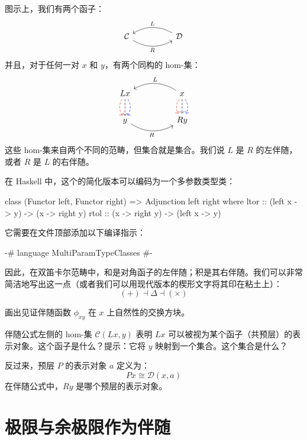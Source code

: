 \documentclass[DaoFP]{subfiles}
\begin{document}
图示上，我们有两个函子：
\[
 \begin{tikzcd}
  \mathcal{C}
  \arrow[rr, bend right, "R"']
  &&
  \mathcal{D}
  \arrow[ll, bend right, "L"']
  \end{tikzcd}
\]
并且，对于任何一对 $x$ 和 $y$，有两个同构的 hom-集：
\[
 \begin{tikzcd}
L x
\arrow[d, bend right, red, dashed]
\arrow[d, dashed]
\arrow[d, bend left, blue, dashed]
  &&
  x
\arrow[d, bend right, red, dashed]
\arrow[d, dashed]
\arrow[d, bend left, blue, dashed]
 \arrow[ll, bend right, "L"']
 \\
y
   \arrow[rr, bend right, "R"']
 &&
 R y
  \end{tikzcd}
\]
这些 hom-集来自两个不同的范畴，但集合就是集合。我们说 $L$ 是 $R$ 的左伴随，或者 $R$ 是 $L$ 的右伴随。

在 Haskell 中，这个的简化版本可以编码为一个多参数类型类：
\begin{haskell}
class (Functor left, Functor right) => Adjunction left right where
  ltor :: (left x -> y) -> (x -> right y)
  rtol :: (x -> right y) -> (left x -> y)
\end{haskell}
它需要在文件顶部添加以下编译指示：
\begin{haskell}
{-# language MultiParamTypeClasses #-}
\end{haskell}

因此，在双笛卡尔范畴中，和是对角函子的左伴随；积是其右伴随。我们可以非常简洁地写出这一点（或者我们可以用现代版本的楔形文字将其印在粘土上）：
\[ (+) \dashv \Delta \dashv (\times) \]

\begin{exercise}
画出见证伴随函数 $\phi_{x y}$ 在 $x$ 上自然性的交换方块。
\end{exercise}

\begin{exercise}
伴随公式左侧的 hom-集 $\mathcal{C} (L x, y)$ 表明 $L x$ 可以被视为某个函子（共预层）的表示对象。这个函子是什么？提示：它将 $y$ 映射到一个集合。这个集合是什么？
\end{exercise}

\begin{exercise}
反过来，预层 $P$ 的表示对象 $a$ 定义为：
\[P x \cong \mathcal{D}(x, a)\]
在伴随公式中，$R y$ 是哪个预层的表示对象。
\end{exercise}

\section{极限与余极限作为伴随}
\end{document}
